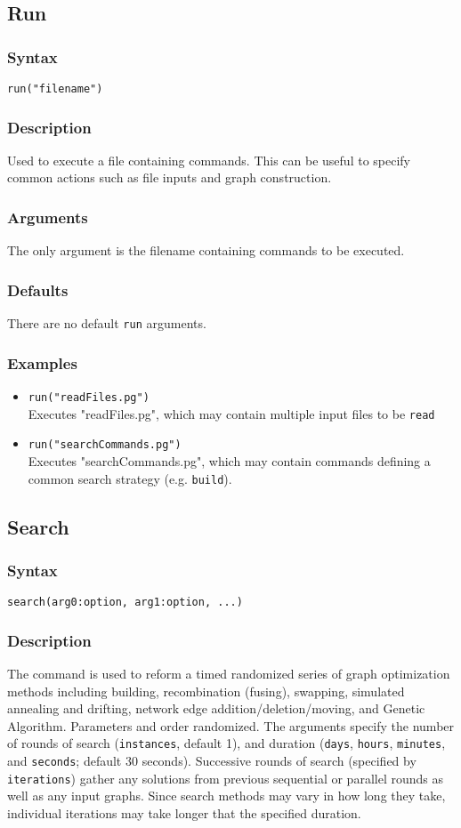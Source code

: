 \documentclass[11pt]{article}
\begin{document}
	\subsection{Run}
		\subsubsection{Syntax}
				\texttt{run("filename")}
		\subsubsection{Description}
			Used to execute a file containing commands.  This can be useful to specify common actions such
			as file inputs and graph construction. 
		\subsubsection{Arguments}
			The only argument is the filename containing commands to be executed.
		\subsubsection{Defaults}
			There are no default \texttt{run} arguments.  
		\subsubsection{Examples}
				\begin{itemize}
				\item{\texttt{run("readFiles.pg")}\\ Executes "readFiles.pg", which may contain multiple input files to be \texttt{read}}
				\item{\texttt{run("searchCommands.pg")}\\ Executes "searchCommands.pg", which may contain commands defining a common search strategy (e.g. \texttt{build}).}
			\end{itemize}
	
	\subsection{Search}
		\subsubsection{Syntax}
		\texttt{search(arg0:option, arg1:option, ...)}
		\subsubsection{Description}
		The command is used to reform a timed randomized series of graph optimization methods including building, 
		recombination (fusing), swapping, 
		simulated annealing and drifting, network edge addition/deletion/moving, and Genetic Algorithm.  Parameters and order
		randomized.  The arguments specify the number of rounds of search (\texttt{instances}, default 1), and duration 
		(\texttt{days}, \texttt{hours}, \texttt{minutes}, and \texttt{seconds}; default 30 seconds).  Successive rounds of search
		(specified by \texttt{iterations}) gather any solutions from previous sequential or parallel rounds as well as any input graphs.
		Since search methods may vary in how long they take, individual iterations may take longer that the specified duration.
\end{document}
